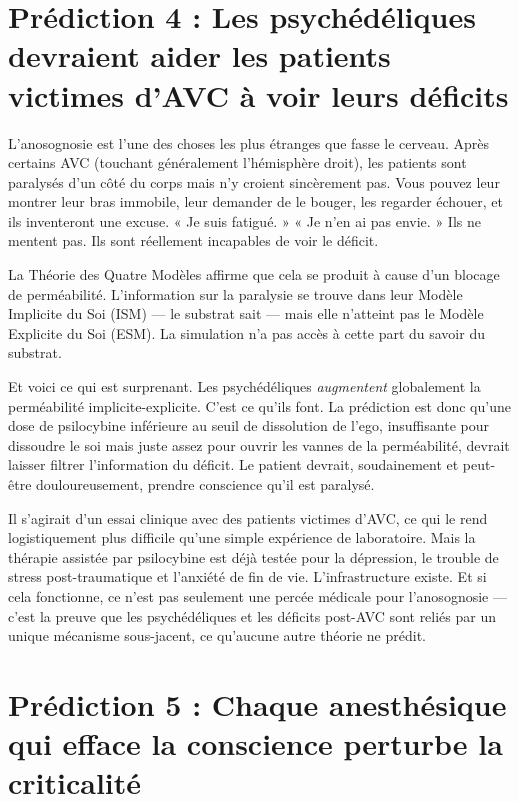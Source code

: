 \documentclass[11pt, twoside, openright]{book}
\begin{document}
\section*{Prédiction 4 : Les psychédéliques devraient aider les patients victimes d'AVC à voir leurs déficits}

L'anosognosie est l'une des choses les plus étranges que fasse le cerveau. Après certains AVC (touchant généralement l'hémisphère droit), les patients sont paralysés d'un côté du corps mais n'y croient sincèrement pas. Vous pouvez leur montrer leur bras immobile, leur demander de le bouger, les regarder échouer, et ils inventeront une excuse. « Je suis fatigué. » « Je n'en ai pas envie. » Ils ne mentent pas. Ils sont réellement incapables de voir le déficit.

La Théorie des Quatre Modèles affirme que cela se produit à cause d'un blocage de perméabilité. L'information sur la paralysie se trouve dans leur Modèle Implicite du Soi (ISM) --- le substrat sait --- mais elle n'atteint pas le Modèle Explicite du Soi (ESM). La simulation n'a pas accès à cette part du savoir du substrat.

Et voici ce qui est surprenant. Les psychédéliques \textit{augmentent} globalement la perméabilité implicite-explicite. C'est ce qu'ils font. La prédiction est donc qu'une dose de psilocybine inférieure au seuil de dissolution de l'ego, insuffisante pour dissoudre le soi mais juste assez pour ouvrir les vannes de la perméabilité, devrait laisser filtrer l'information du déficit. Le patient devrait, soudainement et peut-être douloureusement, prendre conscience qu'il est paralysé.

Il s'agirait d'un essai clinique avec des patients victimes d'AVC, ce qui le rend logistiquement plus difficile qu'une simple expérience de laboratoire. Mais la thérapie assistée par psilocybine est déjà testée pour la dépression, le trouble de stress post-traumatique et l'anxiété de fin de vie. L'infrastructure existe. Et si cela fonctionne, ce n'est pas seulement une percée médicale pour l'anosognosie --- c'est la preuve que les psychédéliques et les déficits post-AVC sont reliés par un unique mécanisme sous-jacent, ce qu'aucune autre théorie ne prédit.

\section*{Prédiction 5 : Chaque anesthésique qui efface la conscience perturbe la criticalité}
\end{document}
